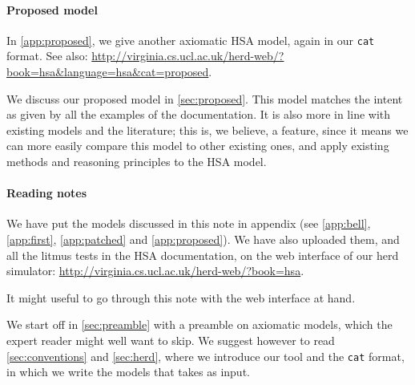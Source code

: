 \documentclass[a4paper]{article}
\begin{document}
\paragraph{Proposed model}
In \myapp\ref{app:proposed}, we give another axiomatic HSA model, again in our
{\tt cat} format. See also: 
\url{http://virginia.cs.ucl.ac.uk/herd-web/?book=hsa&language=hsa&cat=proposed}.

We discuss our proposed model in \mysec\ref{sec:proposed}. This model matches
the intent as given by all the examples of the documentation. It is also more
in line with existing models and the literature; this is, we believe, a
feature, since it means we can more easily compare this model to other existing
ones, and apply existing methods and reasoning principles to the HSA model.


\paragraph{Reading notes}
We have put the models discussed in this note in appendix (see
\myapp\ref{app:bell}, \ref{app:first}, \ref{app:patched} and
\ref{app:proposed}). We have also uploaded them, and all the litmus tests in the
HSA documentation, on the web interface of our herd simulator:
\url{http://virginia.cs.ucl.ac.uk/herd-web/?book=hsa}.

It might useful to go through this note with the web interface at hand.

We start off in \mysec\ref{sec:preamble} with a preamble on axiomatic models,
which the expert reader might well want to skip. We suggest however to read
\mysec\ref{sec:conventions} and \mysec\ref{sec:herd}, where we introduce our
 tool and the {\tt cat} format, in which we write the models that
 takes as input.
\end{document}
